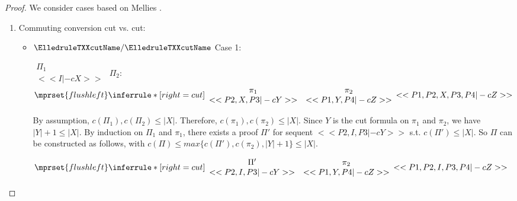 \begin{proof}
  We consider cases based on Mellies \cite{}.
  \begin{enumerate}
  \item Commuting conversion cut vs. cut:
    \begin{itemize}
    \item $\ElledruleTXXcutName/\ElledruleTXXcutName$ Case 1:
      \begin{center}
        \scriptsize
        \begin{math}
          \begin{array}{c}
            \Pi_1 \\
            {<<I |-c X>>}
          \end{array}
        \end{math}
        \qquad\qquad
        $\Pi_2:$
        \begin{math}
          $$\mprset{flushleft}
          \inferrule* [right={\tiny cut}] {
            {
              \begin{array}{cc}
                \pi_1 & \pi_2 \\
                {<<P2, X, P3 |-c Y>>} & {<<P1, Y, P4 |-c Z>>}
              \end{array}
            }
          }{<<P1, P2, X, P3, P4 |-c Z>>}
        \end{math}
      \end{center}
      By assumption, $c(\Pi_1),c(\Pi_2)\leq |X|$. Therefore, $c(\pi_1),c(\pi_2)\leq |X|$.
      Since $Y$ is the cut formula on $\pi_1$ and $\pi_2$, we have $|Y|+1\leq|X|$. By
      induction on $\Pi_1$ and $\pi_1$, there exists a proof $\Pi'$ for sequent
      $<<P2, I, P3 |-c Y>>$ s.t. $c(\Pi')\leq|X|$. So $\Pi$ can be
      constructed as follows, with $c(\Pi)\leq max\{c(\Pi'),c(\pi_2),|Y|+1\}\leq |X|$.
      \begin{center}
        \scriptsize
        \begin{math}
          $$\mprset{flushleft}
          \inferrule* [right={\tiny cut}] {
            {
              \begin{array}{cc}
                \Pi' & \pi_2 \\
                {<<P2, I, P3 |-c Y>>} & {<<P1, Y, P4 |-c Z>>}
              \end{array}
            }
          }{<<P1, P2, I, P3, P4 |-c Z>>}
        \end{math}
      \end{center}


\end{itemize}
\end{enumerate}
\end{proof}
